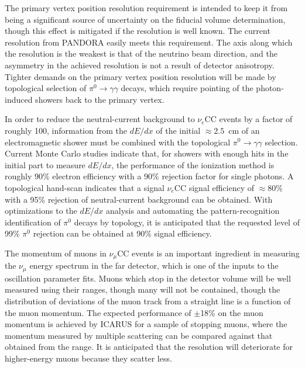 The primary vertex position resolution requirement is intended %
to keep it from being a significant source of uncertainty on the
fiducial volume determination, though this effect is mitigated if the
resolution is well known.  The current resolution from PANDORA easily
meets this requirement.  The axis along which the resolution is the
weakest is that of the neutrino beam direction, and  the asymmetry in the
achieved resolution is not a result of detector anisotropy.   Tighter
demands on the primary vertex position resolution will be made by
topological selection of $\pi^0\rightarrow\gamma\gamma$ decays, which
require pointing of the photon-induced showers back to the primary
vertex.

In order to reduce the neutral-current background to $\nu_e$CC events
by a factor of roughly 100, information from the $dE/dx$ of the
initial $\approx 2.5$~cm of an electromagnetic shower must be combined
with the topological $\pi^0\rightarrow\gamma\gamma$
selection\cite{docdb-6954}.  Current Monte Carlo studies indicate
that, for showers with enough hits in the initial part to measure
$dE/dx$, the performance of the ionization method is roughly 90\%
electron efficiency with a 90\% rejection factor for single photons.
A topological hand-scan indicates that a signal $\nu_e$CC signal
efficiency of $\approx 80$\% with a 95\% rejection of neutral-current
background can be obtained.  With optimizations to the $dE/dx$
analysis and automating the pattern-recognition identification of
$\pi^0$ decays by topology, it is anticipated that the requested level
of 99\% $\pi^0$ rejection can be obtained at 90\% signal efficiency.

The momentum of muons in $\nu_\mu$CC events is an important ingredient
in measuring the $\nu_\mu$ energy spectrum in the far detector, which
is one of the inputs to the oscillation parameter fits.  Muons which
stop in the detector volume will be well measured using their ranges,
though many will not be contained, though the distribution of
deviations of the muon track from a straight line is a function of the
muon momentum.  
The expected performance of $\pm$18\% on the muon
momentum is  achieved by ICARUS for a sample of stopping muons, where
the momentum measured by multiple scattering can be  compared against
that obtained from the range.  It is anticipated that the resolution
will deteriorate for higher-energy muons because they scatter less.


